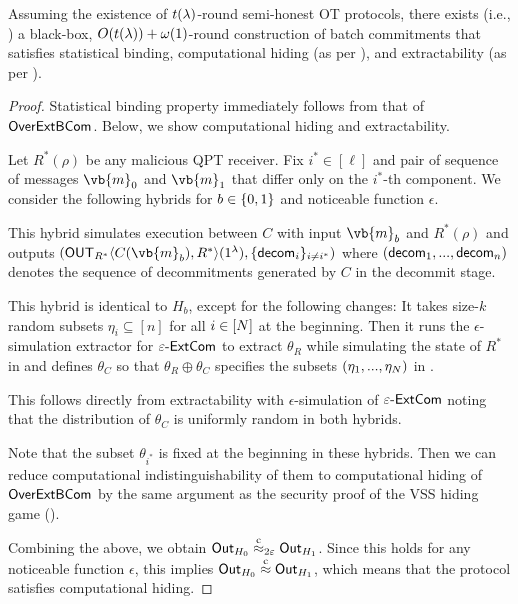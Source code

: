 \begin{theorem}\label{thm:ExtBCom}
 Assuming the existence of $t(\lambda)$-round semi-honest OT protocols, there exists (i.e., ) a black-box, $O(t(\lambda))+\omega(1)$-round construction of  batch commitments 
 that satisfies statistical binding, computational hiding (as per ), and extractability (as per ). 
\end{theorem}   
\begin{proof}
Statistical binding property immediately follows from that of $\mathsf{OverExtBCom}$. Below, we show computational hiding and extractability. 

Let $R^*(\rho)$ be any malicious QPT receiver.
Fix $i^*\in [\ell]$ and pair of sequence of messages $\vb{m}_0$ and $\vb{m}_1$ that differ only on the $i^*$-th component. 
We consider the following hybrids for $b\in \{0,1\}$ and noticeable function $\epsilon$.

 This hybrid simulates execution between $C$ with input $\vb{m}_b$ and $R^*(\rho)$ and outputs $(\OUT_{R^*}\langle C(\vb{m}_b),R^* \rangle(1^\secpar),\{\decom_{i}\}_{i\ne i^*})$ 
where $(\mathsf{decom}_1,...,\mathsf{decom}_n)$ denotes the sequence of decommitments generated by $C$ in the decommit stage.

 This hybrid is identical to $H_b$, except for the following changes: It takes size-$k$ random subsets $\eta_i\subseteq [n]$ for all $i\in [N]$ at the beginning. 
Then it runs the $\epsilon$-simulation extractor for $\varepsilon\text{-}\mathsf{ExtCom}$ to extract 
$\theta_R$ while simulating the state of $R^*$ in 
and defines $\theta_C$ so that $\theta_R\oplus \theta_C$ specifies the subsets $(\eta_1,...,\eta_N)$ in . 

 This follows directly from extractability with $\epsilon$-simulation  of $\varepsilon\text{-}\mathsf{ExtCom}$ noting that the distribution of $\theta_C$ is uniformly random in both hybrids.   

Note that the subset $\theta_{i^*}$ is fixed at the beginning in these hybrids. Then we can reduce computational indistinguishability of them to computational hiding of $\mathsf{OverExtBCom}$ by the same argument as the security proof of the  VSS hiding game (). 

Combining the above, we obtain 
$\mathsf{Out}_{H_0} \stackrel{\text{c}}{\approx}_{2\varepsilon} \mathsf{Out}_{H_1}$. Since this holds for any noticeable function $\epsilon$, this implies $\mathsf{Out}_{H_0} \stackrel{\text{c}}{\approx} \mathsf{Out}_{H_1}$, which means that the protocol satisfies computational hiding.


\end{proof}
